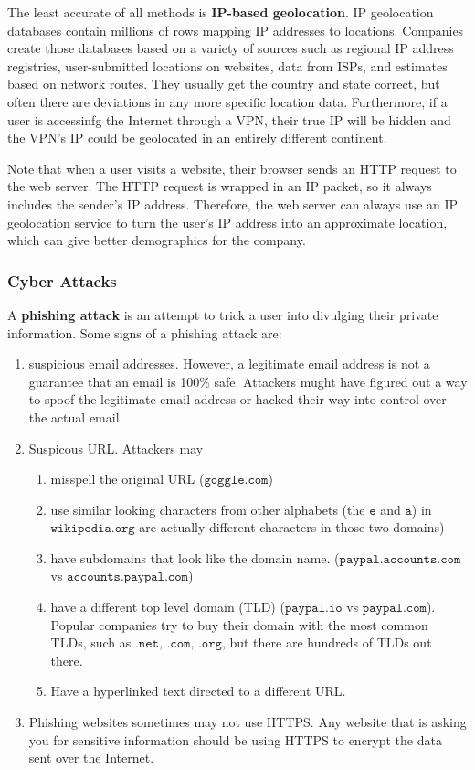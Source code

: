 \documentclass[a4paper, 12pt]{report}
\theoremstyle{remark}
\theoremstyle{definition}
\begin{document}
The least accurate of all methods is \textbf{IP-based geolocation}. IP geolocation databases contain millions of rows mapping IP addresses to locations. Companies create those databases based on a variety of sources such as regional IP address registries, user-submitted locations on websites, data from ISPs, and estimates based on network routes. They usually get the country and state correct, but often there are deviations in any more specific location data. Furthermore, if a user is accessinfg the Internet through a VPN, their true IP will be hidden and the VPN's IP could be geolocated in an entirely different continent. 

Note that when a user visits a website, their browser sends an HTTP request to the web server. The HTTP request is wrapped in an IP packet, so it always includes the sender's IP address. Therefore, the web server can always use an IP geolocation service to turn the user's IP address into an approximate location, which can give better demographics for the company. 

\subsubsection{Cyber Attacks}
A \textbf{phishing attack} is an attempt to trick a user into divulging their private information. Some signs of a phishing attack are: 
\begin{enumerate}
    \item suspicious email addresses. However, a legitimate email address is not a guarantee that an email is 100\% safe. Attackers mught have figured out a way to spoof the legitimate email address or hacked their way into control over the actual email. 
    \item Suspicous URL. Attackers may
    \begin{enumerate}
        \item misspell the original URL ($\texttt{goggle.com}$)
        \item use similar looking characters from other alphabets (the $\texttt{e}$ and $\texttt{a}$) in $\texttt{wikipedia.org}$ are actually different characters in those two domains)
        \item have subdomains that look like the domain name. ($\texttt{paypal.accounts.com}$ vs $\texttt{accounts.paypal.com}$)
        \item have a different top level domain (TLD) ($\texttt{paypal.io}$ vs $\texttt{paypal.com}$). Popular companies try to buy their domain with the most common TLDs, such as $\texttt{.net, .com, .org}$, but there are hundreds of TLDs out there. 
        \item Have a hyperlinked text directed to a different URL. 
    \end{enumerate} 
    \item Phishing websites sometimes may not use HTTPS. Any website that is asking you for sensitive information should be using HTTPS to encrypt the data sent over the Internet.
\end{enumerate}
\end{document}
